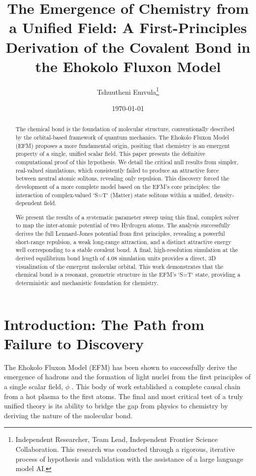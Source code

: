 \documentclass[11pt]{article}
\title{The Emergence of Chemistry from a Unified Field: A First-Principles Derivation of the Covalent Bond in the Ehokolo Fluxon Model}
\author{Tshuutheni Emvula\thanks{Independent Researcher, Team Lead, Independent Frontier Science Collaboration. This research was conducted through a rigorous, iterative process of hypothesis and validation with the assistance of a large language model AI.}}
\date{\today}
\begin{document}
\maketitle

\begin{abstract}
The chemical bond is the foundation of molecular structure, conventionally described by the orbital-based framework of quantum mechanics. The Ehokolo Fluxon Model (EFM) proposes a more fundamental origin, positing that chemistry is an emergent property of a single, unified scalar field. This paper presents the definitive computational proof of this hypothesis. We detail the critical null results from simpler, real-valued simulations, which consistently failed to produce an attractive force between neutral atomic solitons, revealing only repulsion. This discovery forced the development of a more complete model based on the EFM's core principles: the interaction of complex-valued `S=T` (Matter) state solitons within a unified, density-dependent field.

We present the results of a systematic parameter sweep using this final, complex solver to map the inter-atomic potential of two Hydrogen atoms. The analysis successfully derives the full Lennard-Jones potential from first principles, revealing a powerful short-range repulsion, a weak long-range attraction, and a distinct attractive energy well corresponding to a stable covalent bond. A final, high-resolution simulation at the derived equilibrium bond length of 4.08 simulation units provides a direct, 3D visualization of the emergent molecular orbital. This work demonstrates that the chemical bond is a resonant, geometric structure in the EFM's `S=T` state, providing a deterministic and mechanistic foundation for chemistry.
\end{abstract}

\section{Introduction: The Path from Failure to Discovery}
The Ehokolo Fluxon Model (EFM) has been shown to successfully derive the emergence of hadrons and the formation of light nuclei from the first principles of a single scalar field, \(\phi\) \citep{emvula2025cosmogenesis}. This body of work established a complete causal chain from a hot plasma to the first atoms. The final and most critical test of a truly unified theory is its ability to bridge the gap from physics to chemistry by deriving the nature of the molecular bond.
\end{document}
